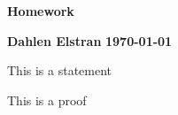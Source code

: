 \documentclass[12pt]{article}
\begin{document}
\begin{newtitle}
  \begin{center}
    \textbf{\Huge Homework}
  \end{center}
  \textbf{Dahlen Elstran} \hfill \textbf{\today}
\end{newtitle}

\begin{statement}
  This is a statement
\end{statement}
\begin{newproof}
  This is a proof
\end{newproof}
\end{document}
